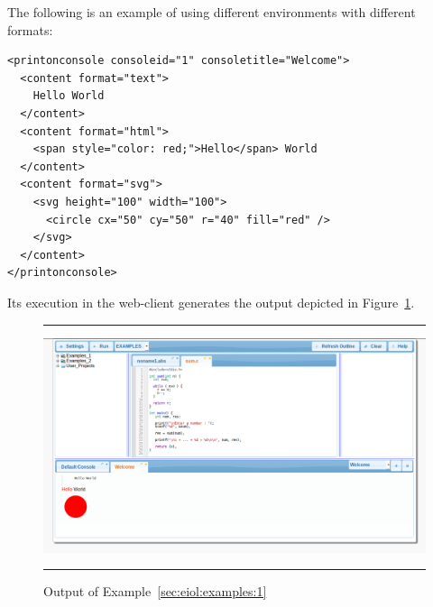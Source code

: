 {%
}

\begin{example}
\label{sec:eiol:examples:1}
%
The following is an example of
 using different
 environments with different formats:

\medskip
\begin{lstlisting}
<printonconsole consoleid="1" consoletitle="Welcome">
  <content format="text">
    Hello World
  </content>
  <content format="html">
    <span style="color: red;">Hello</span> World
  </content>
  <content format="svg">
    <svg height="100" width="100">
      <circle cx="50" cy="50" r="40" fill="red" />
    </svg> 
  </content>
</printonconsole>
\end{lstlisting}

\medskip
\noindent
Its execution in the web-client generates the output depicted in
Figure~\ref{fig:examples:1}.

\begin{figure}[h]
\hrule\smallskip
\begin{center}
\includegraphics[width=1\textwidth]{fig/example1.png}
\end{center}
\caption{Output of Example~\ref{sec:eiol:examples:1}}
\label{fig:examples:1}
\hrule
\end{figure}
\end{example}

